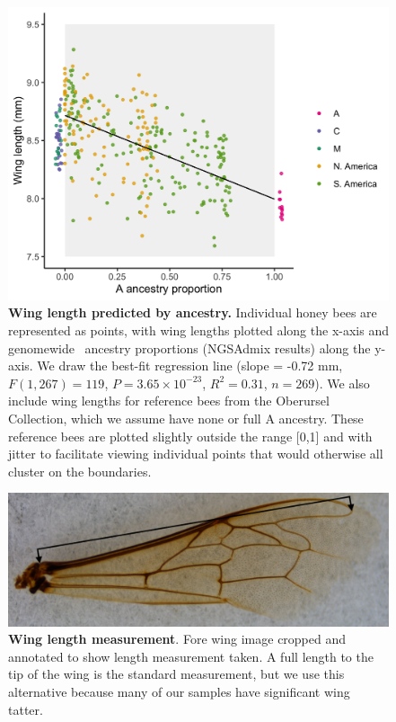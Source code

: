 \begin{figure}[ht]
\includegraphics[width=\textwidth]{chapter1/figures/wing_length_by_A_ancestry.png}
\caption{ \textbf{Wing length predicted by ancestry.} Individual honey bees are represented as points, with wing lengths plotted along the x-axis and genomewide \A\ ancestry proportions (NGSAdmix results) along the y-axis. We draw the best-fit regression line (slope = -0.72 mm, $F(1, 267) = 119$, $P = 3.65\times10^{-23}$, $R^{2} = 0.31$, $n = 269$). We also include wing lengths for  reference bees from the Oberursel Collection, which we assume have none or full A ancestry. These reference bees are plotted slightly outside the range [0,1] and with jitter to facilitate viewing individual points that would otherwise all cluster on the boundaries.}
\label{wing_length_by_A_ancestry}
\end{figure}

\begin{figure}[ht]
\includegraphics{chapter1/figures/wing_length_measurement.png}
\caption{ \textbf{Wing length measurement}. Fore wing image cropped and annotated to show length measurement taken. A full length to the tip of the wing is the standard measurement, but we use this alternative because many of our samples have significant wing tatter.}
\label{wing_image}
\end{figure}

